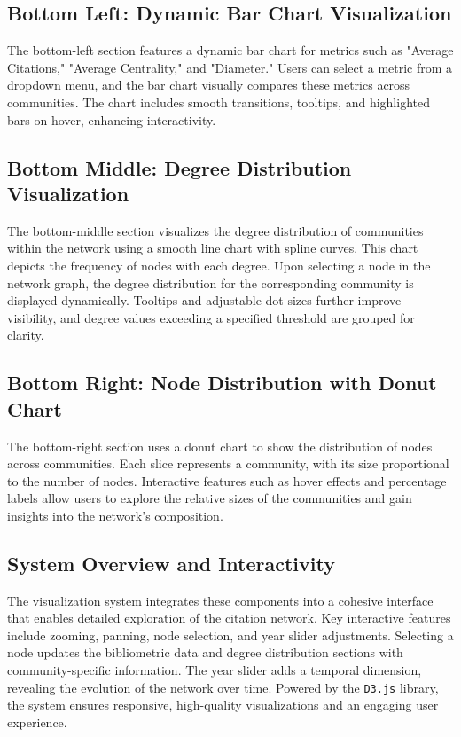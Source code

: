 \documentclass[11pt]{article}
\begin{document}
\subsection{Bottom Left: Dynamic Bar Chart Visualization}

The bottom-left section features a dynamic bar chart for metrics such as "Average Citations," "Average Centrality," and "Diameter." Users can select a metric from a dropdown menu, and the bar chart visually compares these metrics across communities. The chart includes smooth transitions, tooltips, and highlighted bars on hover, enhancing interactivity.

\subsection{Bottom Middle: Degree Distribution Visualization}

The bottom-middle section visualizes the degree distribution of communities within the network using a smooth line chart with spline curves. This chart depicts the frequency of nodes with each degree. Upon selecting a node in the network graph, the degree distribution for the corresponding community is displayed dynamically. Tooltips and adjustable dot sizes further improve visibility, and degree values exceeding a specified threshold are grouped for clarity.

\subsection{Bottom Right: Node Distribution with Donut Chart}

The bottom-right section uses a donut chart to show the distribution of nodes across communities. Each slice represents a community, with its size proportional to the number of nodes. Interactive features such as hover effects and percentage labels allow users to explore the relative sizes of the communities and gain insights into the network's composition.

\subsection{System Overview and Interactivity}

The visualization system integrates these components into a cohesive interface that enables detailed exploration of the citation network. Key interactive features include zooming, panning, node selection, and year slider adjustments. Selecting a node updates the bibliometric data and degree distribution sections with community-specific information. The year slider adds a temporal dimension, revealing the evolution of the network over time. Powered by the \texttt{D3.js} library, the system ensures responsive, high-quality visualizations and an engaging user experience.
\end{document}
